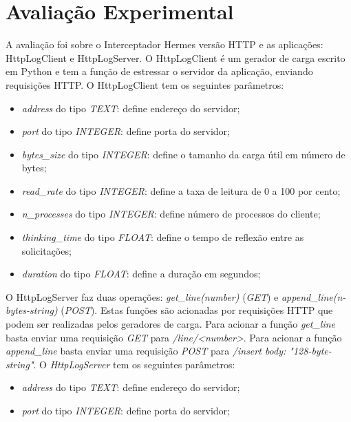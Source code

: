 \chapter{Avaliação Experimental}
\label{cap:experimentacao}

A avaliação foi sobre o Interceptador Hermes versão \gls{HTTP} e as aplicações: HttpLogClient e HttpLogServer. O HttpLogClient é um gerador de carga escrito em Python e tem a função de estressar o servidor da aplicação, enviando requisições HTTP. O HttpLogClient tem os seguintes parâmetros:

\begin{itemize}
\item \textit{address} do tipo \textit{TEXT}: define endereço do servidor;
\item \textit{port} do tipo \textit{INTEGER}: define porta do servidor;
\item \textit{bytes\_size} do tipo \textit{INTEGER}: define o tamanho da carga útil em número de bytes;
\item \textit{read\_rate} do tipo \textit{INTEGER}: define a taxa de leitura de 0 a 100 por cento;
\item \textit{n\_processes} do tipo \textit{INTEGER}: define número de processos do cliente;
\item \textit{thinking\_time} do tipo \textit{FLOAT}: define o tempo de reflexão entre as solicitações;
\item \textit{duration} do tipo \textit{FLOAT}: define a duração em segundos;
\end{itemize}

O HttpLogServer faz duas operações: \textit{get\_line(number)} (\textit{GET}) e \textit{append\_line(n-bytes-string)} (\textit{POST}). Estas funções são acionadas por requisições HTTP que podem ser realizadas pelos geradores de carga. Para acionar a função \textit{get\_line} basta enviar uma requisição \textit{GET} para \textit{/line/<number>}. Para acionar a função \textit{append\_line} basta enviar uma requisição \textit{POST} para \textit{/insert body: "128-byte-string"}. O \textit{HttpLogServer} tem os seguintes parâmetros:

\begin{itemize}
\item \textit{address} do tipo \textit{TEXT}: define endereço do servidor;
\item \textit{port} do tipo \textit{INTEGER}: define porta do servidor;
\end{itemize}

